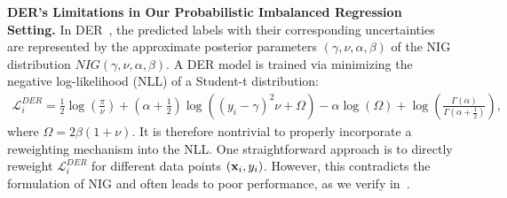 \textbf{DER's Limitations in Our Probabilistic Imbalanced Regression Setting.} In DER~\citep{DER}, the predicted labels with their corresponding uncertainties are represented by the approximate posterior parameters $( \gamma, \nu, \alpha, \beta )$ of the NIG distribution $NIG ( \gamma, \nu, \alpha, \beta )$. A DER model is trained via minimizing the negative log-likelihood (NLL) of a Student-t distribution: 
%
\begin{align}
\mathcal{L}_i^{DER} = \frac{1}{2}\log(\frac{\pi}{\nu})
    + (\alpha+\frac{1}{2})\log((y_i-\gamma)^2\nu+\Omega) - \alpha\log(\Omega)
    + \log(\frac{\Gamma(\alpha)}{\Gamma(\alpha+\frac{1}{2})}),\label{eq:DERnll}
\end{align}
where $\Omega=2\beta(1+\nu)$. It is therefore nontrivial to properly incorporate a reweighting mechanism into the NLL. One straightforward approach is to directly reweight $\mathcal{L}_i^{DER}$ for different data points $({\bf x}_i,y_i)$. However, this contradicts the formulation of NIG and often leads to poor performance, as we verify in~.

